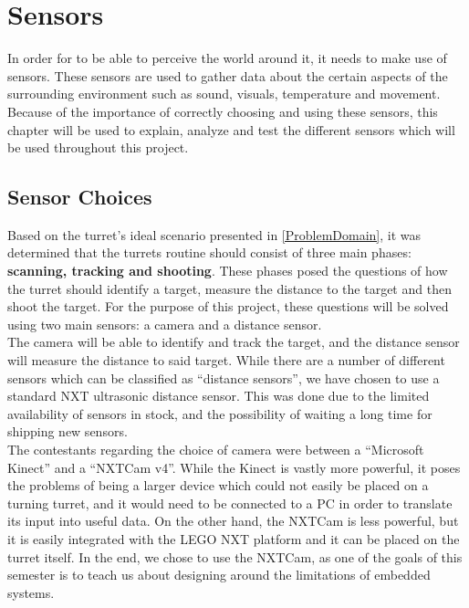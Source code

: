 \chapter{Sensors} \label{sensors}
In order for \name to be able to perceive the world around it, it needs to make
use of sensors. These sensors are used to gather data about the certain aspects
of the surrounding environment such as sound, visuals, temperature and
movement. Because of the importance of correctly choosing and using these
sensors, this chapter will be used to explain, analyze and test the different
sensors which will be used throughout this project.

\section{Sensor Choices}\label{SensorChoice}
Based on the turret's ideal scenario presented in \autoref{ProblemDomain}, it
was determined that the turrets routine should consist of three main phases:
\textbf{scanning, tracking and shooting}. These phases posed the questions of
how the turret should identify a target, measure the distance to the target and then
shoot the target. For the purpose of this project, these questions will be solved using
two main sensors: a camera and a distance sensor. \\
The camera will be able to
identify and track the target, and the distance sensor will measure the
distance to said target. While there are a number of different sensors which
can be classified as ``distance sensors'', we have chosen to use a standard NXT
ultrasonic distance sensor. This was done due to the limited availability of
sensors in stock, and the possibility of waiting a long time for shipping new
sensors.\\
The contestants regarding the choice of camera were between a
``Microsoft Kinect'' and a ``NXTCam v4''. While the Kinect is vastly more
powerful, it poses the problems of being a larger device which could not easily
be placed on a turning turret, and it would need to be connected to a PC in
order to translate its input into useful data. On the other hand, the NXTCam is
less powerful, but it is easily integrated with the LEGO NXT platform and it can
be placed on the turret itself. In the end, we chose to use the NXTCam, as one
of the goals of this semester is to teach us about designing around the
limitations of embedded systems.





% 
% 
% 
% 
